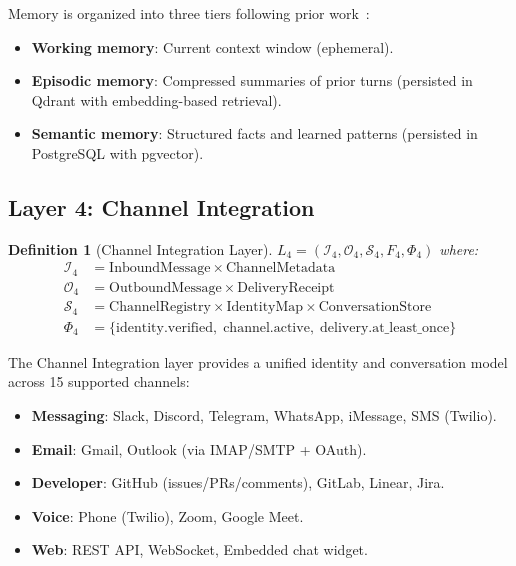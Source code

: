 \documentclass[11pt]{article}
\newtheorem{definition}{Definition}
\begin{document}
Memory is organized into three tiers following prior work~\cite{hanzo2024sdk}:
\begin{itemize}[leftmargin=1.5em]
    \item \textbf{Working memory}: Current context window (ephemeral).
    \item \textbf{Episodic memory}: Compressed summaries of prior turns
          (persisted in Qdrant with embedding-based retrieval).
    \item \textbf{Semantic memory}: Structured facts and learned patterns
          (persisted in PostgreSQL with pgvector).
\end{itemize}

\subsection{Layer 4: Channel Integration}

\begin{definition}[Channel Integration Layer]
    $L_4 = \left(\mathcal{I}_4, \mathcal{O}_4, \mathcal{S}_4, F_4, \Phi_4\right)$ where:
    \begin{align*}
        \mathcal{I}_4 &= \text{InboundMessage} \times \text{ChannelMetadata} \\
        \mathcal{O}_4 &= \text{OutboundMessage} \times \text{DeliveryReceipt} \\
        \mathcal{S}_4 &= \text{ChannelRegistry} \times \text{IdentityMap} \times
                         \text{ConversationStore} \\
        \Phi_4 &= \{\text{identity.verified},\; \text{channel.active},\;
                    \text{delivery.at\_least\_once}\}
    \end{align*}
\end{definition}

The Channel Integration layer provides a unified identity and conversation
model across 15 supported channels:
\begin{itemize}[leftmargin=1.5em, itemsep=0pt]
    \item \textbf{Messaging}: Slack, Discord, Telegram, WhatsApp, iMessage,
          SMS (Twilio).
    \item \textbf{Email}: Gmail, Outlook (via IMAP/SMTP + OAuth).
    \item \textbf{Developer}: GitHub (issues/PRs/comments), GitLab, Linear,
          Jira.
    \item \textbf{Voice}: Phone (Twilio), Zoom, Google Meet.
    \item \textbf{Web}: REST API, WebSocket, Embedded chat widget.
\end{itemize}
\end{document}
